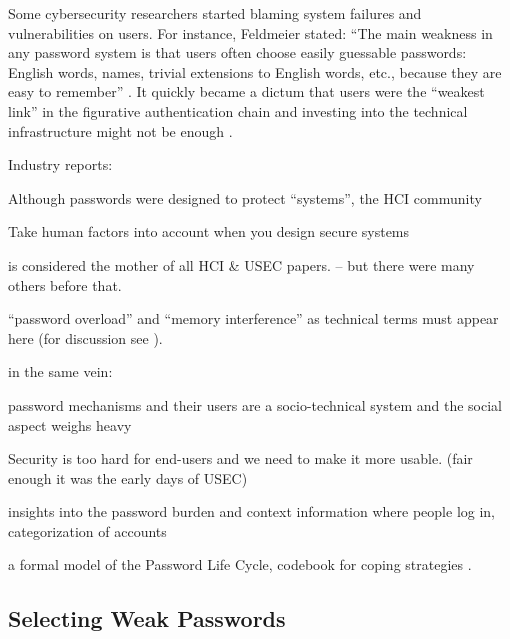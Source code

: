 Some cybersecurity researchers started blaming system failures and vulnerabilities on users. For instance, Feldmeier \etal stated: ``The main weakness in any password system is that users often choose easily guessable passwords: English words, names, trivial extensions to English words, etc., because they are easy to remember'' \cite{Feldmeier1990UnixPasswordSecurity}. It quickly became a dictum that users were the ``weakest link'' in the figurative authentication chain and investing into the technical infrastructure might not be enough \cite{Sasse2001WeakestLink}. 


Industry reports: \cite{CSID2012PasswordHabits}


Although passwords were designed to protect ``systems'', the HCI community


Take human factors into account when you design secure systems \cite{Sasse2005UsableSecurityPosition}


\cite{Adams1999UsersEnemy} is considered the mother of all HCI \& USEC papers. -- but there were many others before that.



``password overload'' and ``memory interference'' as technical terms must appear here (for discussion see \cite{Yang2016MnemonicSentenceBased}).

in the same vein: \cite{Chiasson2009InterferencesGraphical}


password mechanisms and their users are a socio-technical system and the social aspect weighs heavy \cite{Weirich2001PrettyGoodPersuasion}

Security is too hard for end-users and we need to make it more usable. (fair enough it was the early days of USEC) \cite{Dourish2004UserStrategiesEveryday}

insights into the password burden and context information where people log in, categorization of accounts \cite{Hayashi2011DiaryStudyPWs}


a formal model of the Password Life Cycle, codebook for coping strategies \cite{Stobert2014PasswordLifeCycle}.

	\subsection{Selecting Weak Passwords}

